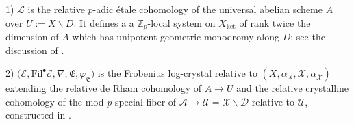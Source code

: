 \documentclass[asterisque,english]{smfart}
\begin{document}
1)  $\mathcal{L}$ is the relative $p$-adic \'etale cohomology of the universal abelian scheme $A$ over $U:=X\backslash D$. It defines a a $\mathbb{Z}_p$-local system on $X_{\mathrm{ket}}$ of rank twice the dimension of $A$ which has unipotent geometric  monodromy  along $D$; see the discussion of \cite[\S 5.2]{DLLZb}.
\smallskip

2) $\bigl(\mathcal{E},\mathrm{Fil}^\bullet \mathcal{E}, \nabla,\mathfrak{E},\varphi_{\mathfrak{E}}\bigr) $  is the  Frobenius log-crystal relative to $(X,\alpha_X,\overline{\mathcal{X}},\alpha_{\overline{\mathcal{X}}})$ extending the relative de Rham cohomology of $A\to U$ and the relative crystalline cohomology of the mod $p$ special fiber of $\mathcal{A} \to \mathcal{U}=\mathcal{X}\backslash \mathcal{D}$ relative to $\mathcal{U}$,  constructed in \cite[\S 3.2]{MP}.
\smallskip
\end{document}
